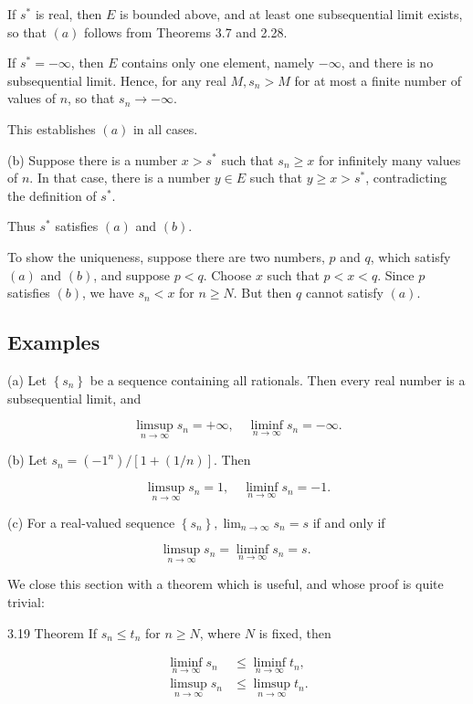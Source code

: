 \documentclass[10pt]{article}
\begin{document}
If $s^{*}$ is real, then $E$ is bounded above, and at least one subsequential limit exists, so that $(a)$ follows from Theorems 3.7 and 2.28.

If $s^{*}=-\infty$, then $E$ contains only one element, namely $-\infty$, and there is no subsequential limit. Hence, for any real $M, s_{n}>M$ for at most a finite number of values of $n$, so that $s_{n} \rightarrow-\infty$.

This establishes $(a)$ in all cases.

(b) Suppose there is a number $x>s^{*}$ such that $s_{n} \geq x$ for infinitely many values of $n$. In that case, there is a number $y \in E$ such that $y \geq x>s^{*}$, contradicting the definition of $s^{*}$.

Thus $s^{*}$ satisfies $(a)$ and $(b)$.

To show the uniqueness, suppose there are two numbers, $p$ and $q$, which satisfy $(a)$ and $(b)$, and suppose $p<q$. Choose $x$ such that $p<x<q$. Since $p$ satisfies $(b)$, we have $s_{n}<x$ for $n \geq N$. But then $q$ cannot satisfy $(a)$.

\subsection{Examples}
(a) Let $\left\{s_{n}\right\}$ be a sequence containing all rationals. Then every real number is a subsequential limit, and

$$
\limsup _{n \rightarrow \infty} s_{n}=+\infty, \quad \liminf _{n \rightarrow \infty} s_{n}=-\infty .
$$

(b) Let $s_{n}=\left(-1^{n}\right) /[1+(1 / n)]$. Then

$$
\limsup _{n \rightarrow \infty} s_{n}=1, \quad \liminf _{n \rightarrow \infty} s_{n}=-1 .
$$

(c) For a real-valued sequence $\left\{s_{n}\right\}, \lim _{n \rightarrow \infty} s_{n}=s$ if and only if

$$
\limsup _{n \rightarrow \infty} s_{n}=\liminf _{n \rightarrow \infty} s_{n}=s \text {. }
$$

We close this section with a theorem which is useful, and whose proof is quite trivial:

3.19 Theorem If $s_{n} \leq t_{n}$ for $n \geq N$, where $N$ is fixed, then

$$
\begin{aligned}
\liminf _{n \rightarrow \infty} s_{n} & \leq \liminf _{n \rightarrow \infty} t_{n}, \\
\limsup _{n \rightarrow \infty} s_{n} & \leq \limsup _{n \rightarrow \infty} t_{n} .
\end{aligned}
$$
\end{document}
